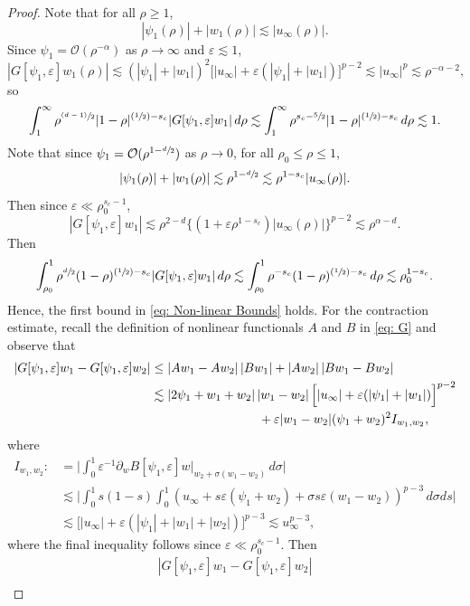 \documentclass[JEP,XML,SOM,Unicode]{cedram}
\newcommand{\Psfrac}[2]{(\sfrac{#1}{#2})}
\newcommand{\psfrac}[2]{\sfrac{(#1)}{#2}}
\theoremstyle{plain}
\theoremstyle{definition}
\begin{document}
\begin{proof}
Note that for all $\rho\ge1$,
\[
|\psi_1(\rho)|+|w_1(\rho)|\lesssim |u_\infty(\rho)|.
\]
Since $\psi_1=\mathcal O( \rho^{-\alpha})$ as $\rho\to\infty$ and $\varepsilon\lesssim 1$,
\[
|G[\psi_1,\varepsilon]w_1(\rho)|\lesssim (|\psi_1|+|w_1|)^2\Big[|u_\infty|+\varepsilon (|\psi_1|+|w_1|)\Big]^{p-2}\lesssim |u_\infty|^p\lesssim \rho^{-\alpha-2},
\]
so
\[
\int_1^\infty \rho^{\psfrac{d-1}{2}}|1-\rho|^{\Psfrac{1}{2}-s_c}|G[\psi_1,\varepsilon]w_1|\,d\rho\lesssim \int_1^\infty \rho^{s_c-\sfrac{5}{2}}|1-\rho|^{\Psfrac{1}{2}-s_c}\,d\rho\lesssim1.
\]
Note that since $\psi_1=\mathcal O(\rho^{1-\sfrac{d}{2}})$ as $\rho\to0$, for all $\rho_0\le\rho\le 1$,
\[
|\psi_1(\rho)|+|w_1(\rho)|\lesssim \rho^{1-\sfrac{d}{2}}\lesssim \rho^{1-s_c}|u_\infty(\rho)|.
\]
Then since $\varepsilon\ll\rho_0^{s_c-1}$,
\[
|G[\psi_1,\varepsilon]w_1|\lesssim \rho^{2-d}\{(1+\varepsilon \rho^{1-s_c})|u_\infty(\rho)|\}^{p-2}\lesssim \rho^{\alpha-d}.
\]
Then
\[
\int_{\rho_0}^1 \rho^{\sfrac{d}{2}}(1-\rho)^{\Psfrac{1}{2}-s_c}|G[\psi_1,\varepsilon]w_1|\, d\rho\lesssim \int_{\rho_0}^1 \rho^{-s_c}(1-\rho)^{\Psfrac{1}{2}-s_c}\,d\rho\lesssim\rho_0^{1-s_c}.
\]
Hence, the first bound in \eqref{eq: Non-linear Bounds} holds. For the contraction estimate, recall the definition of nonlinear functionals $A$ and $B$ in \eqref{eq: G} and observe that
\[
\begin{aligned}
|G[\psi_1,\varepsilon]w_1-G[\psi_1,\varepsilon]w_2| &\le|Aw_1-Aw_2|\,|Bw_1|+|Aw_2|\, |Bw_1-Bw_2|\\
&\lesssim|2\psi_1+w_1+w_2|\, |w_1-w_2|\,\Big[|u_\infty|+\varepsilon (|\psi_1|+|w_1|)\Big]^{p-2}\\
&\hspace*{3cm}+\varepsilon|w_1-w_2|(\psi_1+w_2)^2 I_{w_1,w_2},
\end{aligned}
\]
where
\[
\begin{aligned}
I_{w_1,w_2}:&=\bigg|\int_0^1\varepsilon^{-1}\partial_w B[\psi_1,\varepsilon]w\Big|_{w_2+\sigma(w_1-w_2)}\,d\sigma\bigg|\\
&\lesssim\bigg|\int_0^1s(1-s)\int_0^1(u_\infty+s\varepsilon (\psi_1+w_2)+\sigma s\varepsilon (w_1-w_2))^{p-3}\,d\sigma ds\bigg|\\
&\lesssim \Big[|u_\infty|+\varepsilon (|\psi_1|+|w_1|+|w_2|)\Big]^{p-3} \lesssim u_\infty^{p-3},
\end{aligned}
\]
where the final inequality follows since $\varepsilon\ll\rho_0^{s_c-1}$. Then
\begin{multline*}
|G[\psi_1,\varepsilon]w_1-G[\psi_1,\varepsilon]w_2|\\

\end{multline*}
\end{proof}
\end{document}
